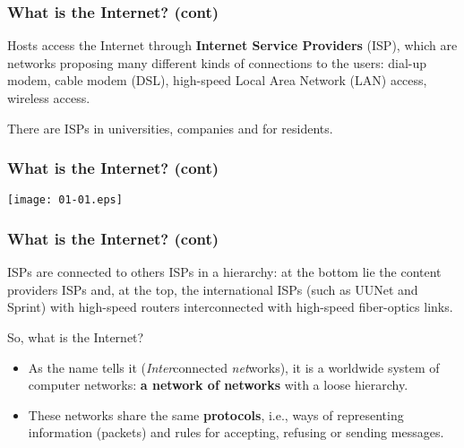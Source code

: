 %
\begin{frame}
\frametitle{What is the Internet? (cont)}

Hosts access the Internet through \textbf{Internet Service Providers}
(ISP), which are networks proposing many different kinds of
connections to the users: dial-up modem, cable modem (DSL), high-speed
Local Area Network (LAN) access, wireless access.

\bigskip

There are ISPs in universities, companies and for residents.

\end{frame}

%
\begin{frame}
\frametitle{What is the Internet? (cont)}

\begin{center}
  \texttt{[image: 01-01.eps]}
\end{center}

\end{frame}

%
\begin{frame}
\frametitle{What is the Internet? (cont)}

ISPs are connected to others ISPs in a hierarchy: at the bottom lie
the content providers ISPs and, at the top, the international ISPs
(such as UUNet and Sprint) with high-speed routers interconnected with
high-speed fiber-optics links.

\bigskip

So, what is the Internet? 

\begin{itemize}

  \item As the name tells it (\emph{Inter\/}connected \emph{net\/}works),
  it is a worldwide system of computer networks: \textbf{a network of
  networks} with a loose hierarchy.

  \item These networks share the same \textbf{protocols}, i.e., ways
  of representing information (packets) and rules for accepting,
  refusing or sending messages.

\end{itemize}

\end{frame}

